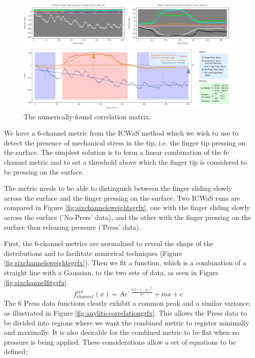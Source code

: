 \begin{figure}[tbph]
\centering
\includegraphics[width=0.95\linewidth]{Chapter4/Figs/numericCorrelationGrfx}
\caption{The numerically-found correlation matrix.}
\label{fig:numericcorrelationgrfx}
\end{figure}


\newcommand{\mL}{L^-}
\newcommand{\pL}{L^+}
\newcommand{\mCa}{Ca^-}
\newcommand{\pCa}{Ca^+}
\newcommand{\mCb}{Cb^-}
\newcommand{\pCb}{Cb^+}

\newcommand{\CmL}{C_{\mL}}
\newcommand{\CpL}{C_{\pL}}
\newcommand{\CmCa}{C_{\mCa}}
\newcommand{\CpCa}{C_{\pCa}}
\newcommand{\CmCb}{C_{\mCb}}
\newcommand{\CpCb}{C_{\pCb}}
We have a 6-channel metric from the ICWaS method which we wish to use to detect the presence of mechanical stress in the tip, i.e. the finger tip pressing on the surface. The simplest solution is to form a linear combination of the 6-channel metric and to set a threshold above which the finger tip is considered to be pressing on the surface. 

The metric needs to be able to distinguish between the finger sliding slowly across the surface and the finger pressing on the surface. Two ICWaS runs are compared in Figure  \ref{fig:sixchannelsweightsgrfx}, one with the finger sliding slowly across the surface ('No-Press' data), and the other with the finger pressing on the surface then releasing pressure ('Press' data). 

First, the 6-channel metrics are normalized to reveal the shape of the distributions and to facilitate numerical techniques (Figure \ref{fig:sixchannelsweightsgrfx}). Then we fit a function, which is a combination of a straight line with a Gaussian, to the two sets of data, as seen in Figure \ref{fig:sixchannelfitgrfx}. 
\begin{equation}
f^{set}_{channel} (x) = A e^{-\frac{0.5 (x-\mu )^2}{\sigma ^2}}+m x +c
\end{equation}
The 6 Press data functions clearly exhibit a common peak  and a similar variance, as illustrated in Figure \ref{fig:anyliticcorrelationgrfx}. This allows the Press data to be divided into regions where we want the combined metric to register minimally and maximally. It is also desirable for the combined metric to be flat when no pressure is being applied. These considerations allow a set of equations to be defined:


